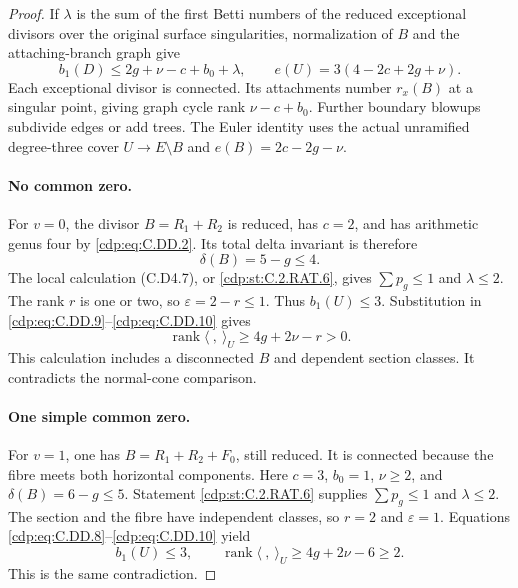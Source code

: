 \begin{proof}
If $\lambda$ is the sum of the first Betti numbers
of the reduced exceptional divisors over the original
surface singularities, normalization of $B$ and the
attaching-branch graph give
\[
 b_1(D)\le2g+\nu-c+b_0+\lambda,
 \qquad e(U)=3(4-2c+2g+\nu).
\tag{C.DD.10}\label{cdp:eq:C.DD.10}
\]
Each exceptional divisor is connected. Its attachments
number $r_x(B)$ at a singular point, giving graph
cycle rank $\nu-c+b_0$. Further boundary blowups
subdivide edges or add trees. The Euler identity
uses the actual unramified degree-three cover
$U\to E\setminus B$ and
$e(B)=2c-2g-\nu$.

\paragraph{No common zero.}
For $v=0$, the divisor $B=R_1+R_2$ is reduced,
has $c=2$, and has arithmetic genus four by
\eqref{cdp:eq:C.DD.2}. Its total delta invariant is therefore
\[
                         \delta(B)=5-g\le4.
\tag{C.DD.11}\label{cdp:eq:C.DD.11}
\]
The local calculation (C.D4.7), or \ref{cdp:st:C.2.RAT.6},
gives $\sum p_g\le1$ and $\lambda\le2$.
The rank $r$ is one or two, so
$\varepsilon=2-r\le1$. Thus $b_1(U)\le3$.
Substitution in \eqref{cdp:eq:C.DD.9}--\eqref{cdp:eq:C.DD.10} gives
\[
                  \operatorname{rank}\langle\ ,\ \rangle_U
                        \ge4g+2\nu-r>0.
\tag{C.DD.12}\label{cdp:eq:C.DD.12}
\]
This calculation includes a disconnected $B$ and
dependent section classes. It contradicts the
normal-cone comparison.

\paragraph{One simple common zero.}
For $v=1$, one has $B=R_1+R_2+F_0$, still reduced.
It is connected because the fibre meets both
horizontal components. Here $c=3$, $b_0=1$,
$\nu\ge2$, and
$\delta(B)=6-g\le5$.
Statement \ref{cdp:st:C.2.RAT.6} supplies
$\sum p_g\le1$ and $\lambda\le2$.
The section and the fibre have independent classes,
so $r=2$ and $\varepsilon=1$.
Equations \eqref{cdp:eq:C.DD.8}--\eqref{cdp:eq:C.DD.10} yield
\[
 b_1(U)\le3,\qquad
 \operatorname{rank}\langle\ ,\ \rangle_U
                         \ge4g+2\nu-6\ge2.
\tag{C.DD.13}\label{cdp:eq:C.DD.13}
\]
This is the same contradiction.


\end{proof}
